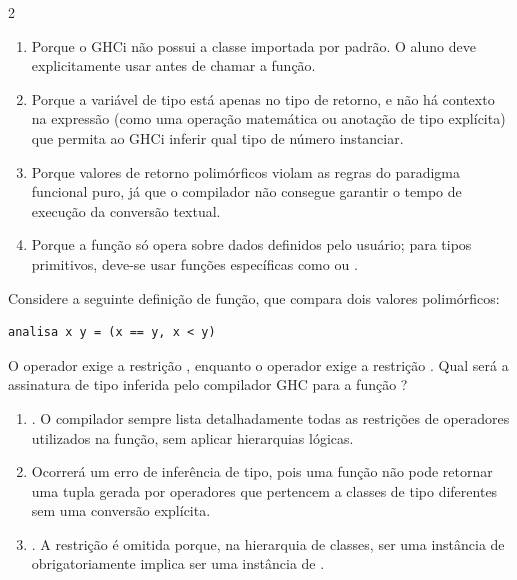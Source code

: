 \documentclass[a4paper,10pt,brazil]{article}
\begin{document}
\begin{multicols}{2}
\begin{enumerate}
  \item Porque o GHCi não possui a classe  importada por padrão. O aluno deve explicitamente usar  antes de chamar a função.

  \item Porque a variável de tipo  está apenas no tipo de retorno, e não há contexto na expressão (como uma operação matemática ou anotação de tipo explícita) que permita ao GHCi inferir qual tipo de número instanciar.

  \item Porque valores de retorno polimórficos violam as regras do paradigma funcional puro, já que o compilador não consegue garantir o tempo de execução da conversão textual.

  \item Porque a função  só opera sobre dados definidos pelo usuário; para tipos primitivos, deve-se usar funções específicas como  ou .


\end{enumerate}

Considere a seguinte definição de função, que compara dois valores polimórficos:
\begin{verbatim}
analisa x y = (x == y, x < y)
\end{verbatim}
O operador \haskellinline{==} exige a restrição , enquanto o operador \haskellinline{<} exige a restrição . Qual será a assinatura de tipo inferida pelo compilador GHC para a função ?

\begin{enumerate}
  \item {}. O compilador sempre lista detalhadamente todas as restrições de operadores utilizados na função, sem aplicar hierarquias lógicas.

  \item Ocorrerá um erro de inferência de tipo, pois uma função não pode retornar uma tupla gerada por operadores que pertencem a classes de tipo diferentes sem uma conversão explícita.

  \item {}. A restrição  é omitida porque, na hierarquia de classes, ser uma instância de  obrigatoriamente implica ser uma instância de .


\end{enumerate}
\end{multicols}
\end{document}
